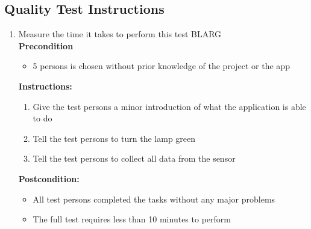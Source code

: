 \documentclass[a4paper]{article}
\newlength{\testlabellength}
\newenvironment{testlist}{\begin{enumerate}[label=\bfseries Instruction \thesubsection.\arabic* , labelindent=0pt, labelwidth=\testlabellength , leftmargin=2cm]}{\end{enumerate}}
\newenvironment{precondition}{
{\color{white}BLARG}\\ 
\textbf{Precondition}
\begin{itemize}[labelindent=0cm, labelwidth=2cm , leftmargin=1cm]
}
{\end{itemize}}
\newenvironment{instruction}{
\textbf{Instructions:}
\begin{enumerate}[label=\bfseries  \arabic*., labelindent=0cm, labelwidth=2cm , leftmargin=1cm]
}
{\end{enumerate}}
\newenvironment{postcondition}{
\textbf{Postcondition:}
\begin{itemize}[labelindent=0cm, labelwidth=2cm , leftmargin=1cm]
}
{\end{itemize}}
\begin{document}
\begin{appendices}
\begin{testlist}
\end{testlist}

\subsection{Quality Test Instructions}

\begin{testlist}

	\item Measure the time it takes to perform this test
		\begin{precondition}
			\item 5 persons is chosen without prior knowledge of the project or the app
		\end{precondition}
		\begin{instruction}
			\item Give the test persons a minor introduction of what the application is able to do
            \item Tell the test persons to turn the lamp green
            \item Tell the test persons to collect all data from the sensor
		\end{instruction}
		\begin{postcondition}
			\item All test persons completed the tasks without any major problems
			\item The full test requires less than 10 minutes to perform
		\end{postcondition}


\end{testlist}
\end{appendices}
\end{document}
